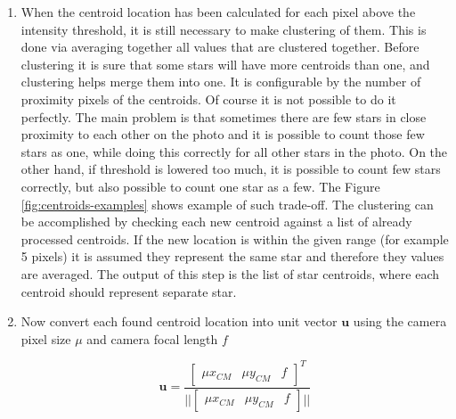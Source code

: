 \documentclass[12pt,a4paper,oneside]{article}
\begin{document}
\begin{enumerate}
\item When the centroid location has been calculated for each pixel above the intensity threshold, it is still necessary to make clustering of them. This is done via averaging together all values that are clustered together. Before clustering it is sure that some stars will have more centroids than one, and clustering helps merge them into one. It is configurable by the number of proximity pixels of the centroids. Of course it is not possible to do it perfectly. The main problem is that sometimes there are few stars in close proximity to each other on the photo and it is possible to count those few stars as one, while doing this correctly for all other stars in the photo. On the other hand, if threshold is lowered too much, it is possible to count few stars correctly, but also possible to count one star as a few. The Figure \ref{fig:centroids-examples} shows example of such trade-off.
The clustering can be accomplished by checking each new centroid against a list of already processed centroids. If the new location is within the given range (for example 5 pixels) it is assumed they represent the same star and therefore they values are averaged. The output of this step is the list of star centroids, where each centroid should represent separate star.


\item Now convert each found centroid location into unit vector $\bm{u}$ using the camera pixel size $\mu$ and camera focal length $f$

\begin{equation}
\bm{u} = \frac{
\begin{bmatrix}
\mu x_{CM} & \mu y_{CM} & f
\end{bmatrix}
^T}
{||
\begin{bmatrix}
\mu x_{CM} & \mu y_{CM} & f
\end{bmatrix}
||}
\end{equation}
\end{enumerate}
\end{document}
